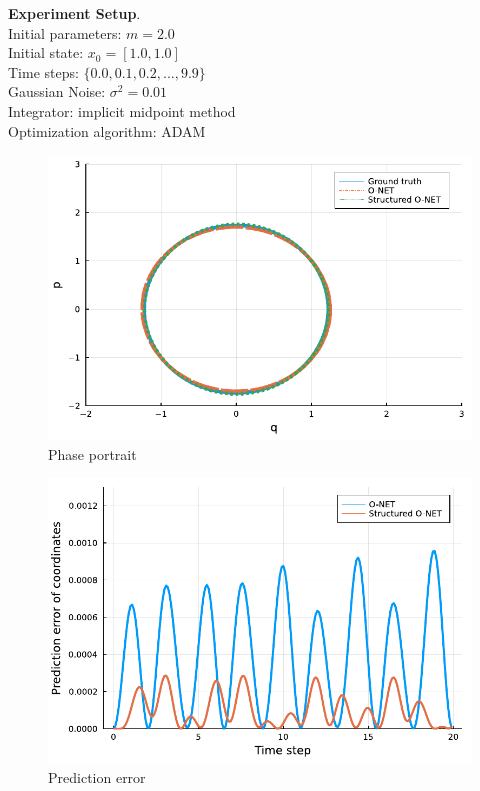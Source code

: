 \documentclass[
	parskip, 			   %
	twoside, 			   %
	DIV=14, 			   %
	BCOR=15.0mm, 		   %
	headsepline, 		   %
	open=right, 		   %
	captions=tableheading, %
	bibliography=totoc,    %
	numbers=noenddot       %
]{scrreprt}
\begin{document}
\textbf{Experiment Setup}.\\
Initial parameters: $m = 2.0$\\
Initial state: $x_0 = [1.0, 1.0]$\\
Time steps: $\{ 0.0, 0.1, 0.2, ..., 9.9 \}$\\
Gaussian Noise: $\sigma^2 = 0.01$\\
Integrator: implicit midpoint method\\
Optimization algorithm: ADAM

\clearpage
\begin{figure}[h!]
    \centering
    \includegraphics[scale=1]{figures/phase_portrait_O_NET.pdf}
    \caption{Phase portrait}
    \label{fig:phase_portrait_O_NET}
\end{figure}

\begin{figure}[h!]
    \centering
    \includegraphics[scale=1]{figures/prediction_error_structured_O_NET.pdf}
    \caption{Prediction error}
    \label{fig:prediction_error_structured_O_NET}
\end{figure}
\end{document}

